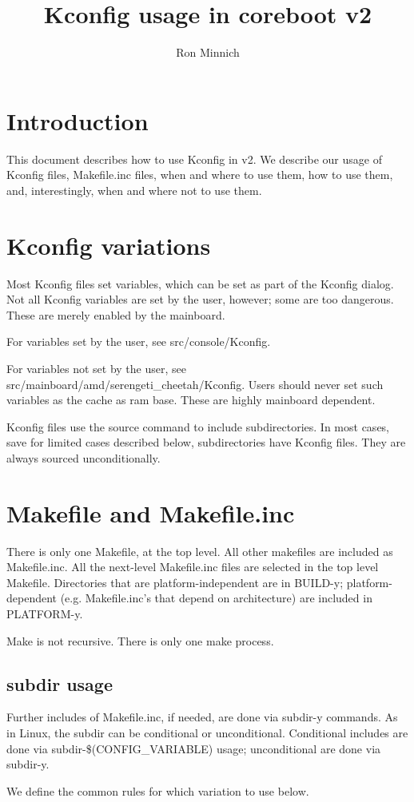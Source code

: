 \documentclass[10pt,letterpaper]{article}
\author{Ron Minnich}
\title{Kconfig usage in coreboot v2}
\begin{document}
\section{Introduction}
This document describes how to use Kconfig in v2. We describe our usage of Kconfig files, Makefile.inc files, when and where to use them, how to use them, and, interestingly, when and where not to use them.
\section{Kconfig variations}
Most Kconfig files set variables, which can be set as part of the Kconfig dialog. Not all Kconfig variables are set by the user, however; some are too dangerous. These are merely enabled by the mainboard.

For variables set by the user, see src/console/Kconfig.

For variables not set by the user, see src/mainboard/amd/serengeti\_cheetah/Kconfig. Users should never set such variables as the cache as ram base. These are highly mainboard dependent.

Kconfig files use the source command to include subdirectories. In most cases, save for limited cases described below, subdirectories have Kconfig files. They are always sourced unconditionally.

\section{Makefile and Makefile.inc}
There is only one Makefile, at the top level. All other makefiles are included as Makefile.inc. All the next-level Makefile.inc files are selected in the top level Makefile. Directories that are platform-independent are in BUILD-y; platform-dependent (e.g. Makefile.inc's that depend on architecture) are included in PLATFORM-y.

Make is not recursive. There is only one make process.
\subsection{subdir usage}
Further includes of Makefile.inc, if needed, are done via subdir-y commands. As in Linux, the subdir can be conditional or unconditional. Conditional includes are done via subdir-\$(CONFIG\_VARIABLE) usage; unconditional are done via subdir-y.

We define the common rules for which variation to use below.
\end{document}
